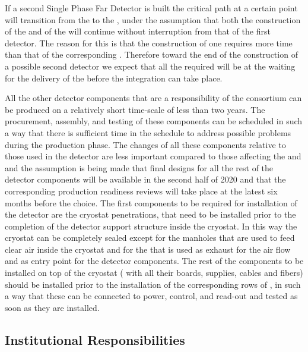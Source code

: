 If a second Single Phase  Far Detector is built the critical
path at a certain point will transition from the 
to the , under the assumption that both the construction
of the  and of the  will continue 
without interruption from that of the first detector. The reason
for this is that the construction of one  requires 
more time than that of the corresponding . Therefore
toward the end of the construction of a possible second detector
we expect that all the required  will be at the
 waiting for the delivery of the  before
the integration can take place.

All the other detector components that are a responsibility of the
 consortium can be produced on a relatively short
time-scale of less than two years. The procurement, assembly, and
testing of these components can be scheduled in such a way that
there is sufficient time in the schedule to address possible 
problems during the production phase. The changes of all these
components relative to those used in the  detector
are less important compared to those affecting the 
and  and the assumption is being made that final
designs for all the rest of the detector components will be 
available in the second half of 2020 and that the corresponding 
production readiness reviews will take place at the latest six months 
before the  choice. The first components to be
required for installation of the detector are the cryostat 
penetrations, that need to be installed prior to the 
completion of the detector support structure inside the cryostat.
In this way the cryostat can be completely sealed except for
the manholes that are used to feed clear air inside the cryostat
and for the  that is used as exhaust for the air flow
and as entry point for the detector components. The rest of the
 components to be installed on top of the 
cryostat ( with all their boards, supplies, cables
and fibers) should be installed prior to the installation of
the corresponding rows of , in such a way that these
can be connected to power, control, and read-out and tested as
soon as they are installed. 

\subsection{Institutional Responsibilities}
\label{sec:fdsp-tpcelec-management-resp}

